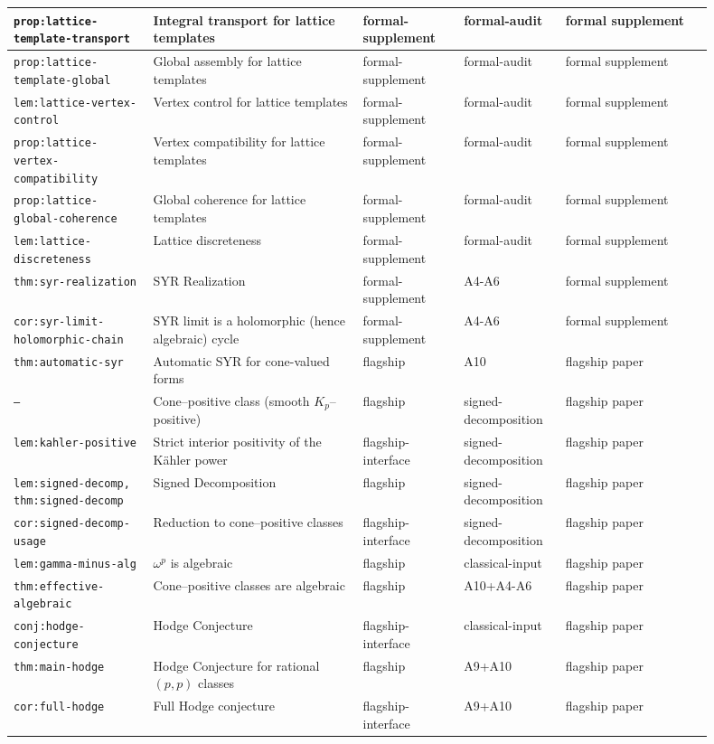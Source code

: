 \documentclass[11pt]{article}
\numberwithin{equation}{section}  %
\theoremstyle{plain}
\theoremstyle{definition}
\theoremstyle{remark}
\begin{document}
\begin{longtable}{|p{0.18\linewidth}|p{0.27\linewidth}|p{0.13\linewidth}|p{0.13\linewidth}|p{0.19\linewidth}|}
\texttt{prop:lattice-template-transport} & Integral transport for lattice templates & formal-supplement & formal-audit & formal supplement \\ \hline
\texttt{prop:lattice-template-global} & Global assembly for lattice templates & formal-supplement & formal-audit & formal supplement \\ \hline
\texttt{lem:lattice-vertex-control} & Vertex control for lattice templates & formal-supplement & formal-audit & formal supplement \\ \hline
\texttt{prop:lattice-vertex-compatibility} & Vertex compatibility for lattice templates & formal-supplement & formal-audit & formal supplement \\ \hline
\texttt{prop:lattice-global-coherence} & Global coherence for lattice templates & formal-supplement & formal-audit & formal supplement \\ \hline
\texttt{lem:lattice-discreteness} & Lattice discreteness & formal-supplement & formal-audit & formal supplement \\ \hline
\texttt{thm:syr-realization} & SYR Realization & formal-supplement & A4-A6 & formal supplement \\ \hline
\texttt{cor:syr-limit-holomorphic-chain} & SYR limit is a holomorphic (hence algebraic) cycle & formal-supplement & A4-A6 & formal supplement \\ \hline
\texttt{thm:automatic-syr} & Automatic SYR for cone-valued forms & flagship & A10 & flagship paper \\ \hline
\texttt{--} & Cone--positive class (smooth $K_p$--positive) & flagship & signed-decomposition & flagship paper \\ \hline
\texttt{lem:kahler-positive} & Strict interior positivity of the K\"ahler power & flagship-interface & signed-decomposition & flagship paper \\ \hline
\texttt{lem:signed-decomp, thm:signed-decomp} & Signed Decomposition & flagship & signed-decomposition & flagship paper \\ \hline
\texttt{cor:signed-decomp-usage} & Reduction to cone--positive classes & flagship-interface & signed-decomposition & flagship paper \\ \hline
\texttt{lem:gamma-minus-alg} & $\omega^p$ is algebraic & flagship & classical-input & flagship paper \\ \hline
\texttt{thm:effective-algebraic} & Cone--positive classes are algebraic & flagship & A10+A4-A6 & flagship paper \\ \hline
\texttt{conj:hodge-conjecture} & Hodge Conjecture & flagship-interface & classical-input & flagship paper \\ \hline
\texttt{thm:main-hodge} & Hodge Conjecture for rational $(p,p)$ classes & flagship & A9+A10 & flagship paper \\ \hline
\texttt{cor:full-hodge} & Full Hodge conjecture & flagship-interface & A9+A10 & flagship paper \\ \hline
\end{longtable}
\endgroup
\end{document}
